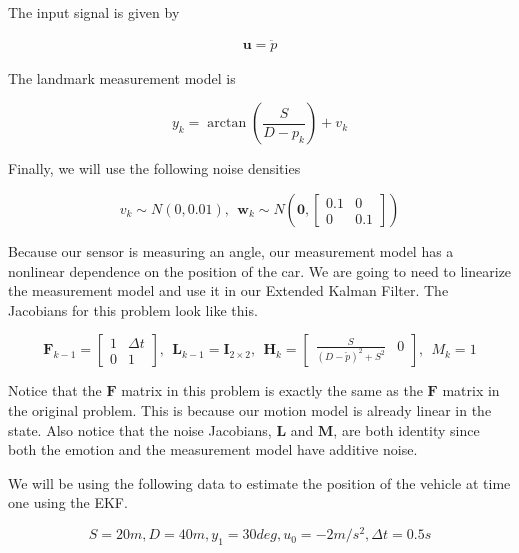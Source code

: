 The input signal is given by

\begin{eqnarray}
\mathbf{u} = \ddot{p} 
\end{eqnarray}

The landmark measurement model is

\begin{equation}
y_k = \arctan(\frac{S}{D - p_k}) + v_k
\end{equation}

Finally, we will use the following noise densities

\begin{equation}
v_k \sim N(0, 0.01), ~~ \mathbf{w}_k \sim N(\mathbf{0}, \begin{bmatrix} 0.1 & 0 \\ 0 & 0.1 \end{bmatrix})
\end{equation}

Because our sensor is measuring an angle, our measurement model has a nonlinear dependence on
the position of the car. We are going to need to linearize the measurement model and use it
in our Extended Kalman Filter. The Jacobians for
this problem look like this. 

\begin{equation}
\mathbf{F}_{k-1} = 
\begin{bmatrix} 
1 & \Delta t \\ 
0 & 1 
\end{bmatrix}, ~~ \mathbf{L}_{k-1} = \mathbf{I}_{2\times 2}, ~~ \mathbf{H}_k =  
\begin{bmatrix} 
\frac{S}{(D - \check{p})^2 + S^2} & 0
\end{bmatrix}, ~~ M_k = 1
\end{equation}


Notice that the $\mathbf{F}$ matrix in this problem is exactly the same as the $\mathbf{F}$ matrix
in the original problem. This is because our motion model
is already linear in the state. Also notice that
the noise Jacobians, $\mathbf{L}$ and $\mathbf{M}$, are both identity since both the emotion and the measurement
model have additive noise. 

We will be using the following data  to estimate the position of the vehicle at time one using the EKF. 

\begin{equation}
S = 20m, D= 40m, y_1 = 30 deg, u_0 = -2m/s^2, \Delta t = 0.5s
\end{equation}


